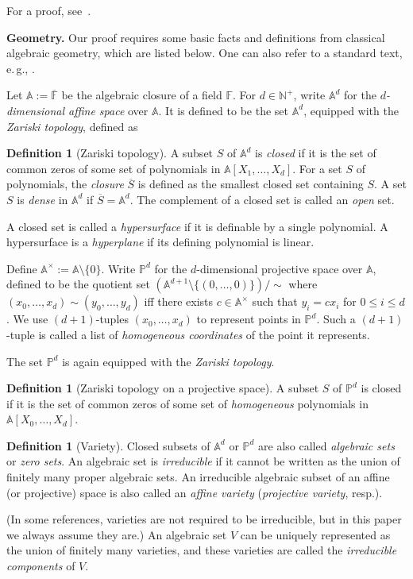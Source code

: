 \documentclass[11pt]{article}
\numberwithin{equation}{section}
\theoremstyle{definition}
\newtheorem{definition}[theorem]{Definition}
\theoremstyle{plain}
\newcommand{\N}{\mathbb N}
\newcommand{\eg}{e.\,g.}
\newcommand{\F}{\mathbb{F}}
\newcommand{\aff}{\mathbb{A}}
\newcommand{\proj}{\mathbb{P}}
\newcommand{\ol}[1]{\overline{#1}}
\begin{document}
For a proof, see~\cite[Lemma~A.36]{AB09}.

\smallskip\noindent
\textbf{Geometry.} Our proof requires some basic facts and definitions from classical algebraic geometry, which are listed below. One can also refer to a standard text, \eg, \cite{Har92, hartshorne2013algebraic}.  

\smallskip
Let $\aff:=\ol{\F}$ be the algebraic closure of a field $\F$. For $d\in\N^+$, write $\aff^d$ for the \emph{$d$-dimensional affine space} over $\aff$. It is defined to be the set $\aff^d$, equipped with the \emph{Zariski topology}, defined as %
\begin{definition}[Zariski topology]   %
A subset $S$ of $\aff^d$ is \emph{closed}
%
if   %
it is the set of common zeros of some
%
set   %
of polynomials in $\aff[X_1,\dots,X_d]$. For
%
a set $S$ of polynomials,
%
%
the \emph{closure} $\ol{S}$
%
is defined as  %
the smallest closed set containing $S$.
%
A set  %
$S$ is \emph{dense} in $\aff^d$  if $\ol{S}=\aff^d$.
%
%
The complement of a closed set is called an \emph{open} set.  %
\end{definition}

%
%
%

A closed set is called a \emph{hypersurface} 
if it is definable by a single polynomial.
A hypersurface is a \emph{hyperplane} if its
defining polynomial is linear.

Define $\aff^\times:= \aff\setminus\{0\}$.
Write $\proj^d$ for the $d$-dimensional projective space over $\aff$, defined to be the quotient set $(\aff^{d+1}\setminus\{(0,\dots,0)\})/\sim$
%
where   %
$(x_0,\dots,x_d)\sim (y_0,\dots,y_d)$ iff there exists $c\in\aff^\times$ such that $y_i=c x_i$ for $0\leq i\leq d$.
%
We use $(d+1)$-tuples $(x_0,\dots,x_d)$ to represent points in $\proj^d$.
%
%
Such a $(d+1)$-tuple is called a list of \emph{homogeneous coordinates}
of the point it represents.   %

The set $\proj^d$ is again equipped with the \emph{Zariski topology}.
%
\begin{definition}[Zariski topology on a projective space] %
A subset $S$ of $\proj^d$ is closed
%
if  %
it is the set of common zeros of some
%
set   %
of \emph{homogeneous} polynomials in  $\aff[X_0,\dots,X_d]$. 
\end{definition}

%
%
\begin{definition}[Variety]  %
Closed subsets of $\aff^d$ or $\proj^d$ are also called
\emph{algebraic sets} or \emph{zero sets}. 
An algebraic set is \emph{irreducible} if it cannot be written
as the union of finitely many proper algebraic sets.
An irreducible algebraic subset of an affine
%
(or projective)    %
space is also called an \emph{affine variety}
%
(\emph{projective variety}, resp.).
\end{definition}
(In some references, varieties are not required to be irreducible, but
in this  %
paper   %
we always assume
%
they are.)  %
An algebraic set $V$ can be uniquely represented as the union of finitely many varieties, and these varieties are called the \emph{irreducible components} of $V$.
\end{document}
